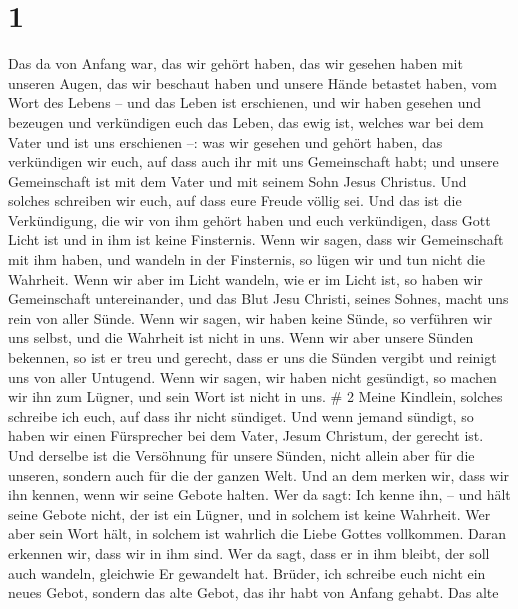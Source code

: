 \hypertarget{section}{%
\section{1}\label{section}}

 Das da von Anfang war, das wir gehört haben, das wir
gesehen haben mit unseren Augen, das wir beschaut haben und unsere Hände
betastet haben, vom Wort des Lebens --  und das Leben ist
erschienen, und wir haben gesehen und bezeugen und verkündigen euch das
Leben, das ewig ist, welches war bei dem Vater und ist uns erschienen
--:  was wir gesehen und gehört haben, das verkündigen wir
euch, auf dass auch ihr mit uns Gemeinschaft habt; und unsere
Gemeinschaft ist mit dem Vater und mit seinem Sohn Jesus Christus.
 Und solches schreiben wir euch, auf dass eure Freude völlig
sei.  Und das ist die Verkündigung, die wir von ihm gehört
haben und euch verkündigen, dass Gott Licht ist und in ihm ist keine
Finsternis.  Wenn wir sagen, dass wir Gemeinschaft mit ihm
haben, und wandeln in der Finsternis, so lügen wir und tun nicht die
Wahrheit.  Wenn wir aber im Licht wandeln, wie er im Licht
ist, so haben wir Gemeinschaft untereinander, und das Blut Jesu Christi,
seines Sohnes, macht uns rein von aller Sünde.  Wenn wir
sagen, wir haben keine Sünde, so verführen wir uns selbst, und die
Wahrheit ist nicht in uns.  Wenn wir aber unsere Sünden
bekennen, so ist er treu und gerecht, dass er uns die Sünden vergibt und
reinigt uns von aller Untugend.  Wenn wir sagen, wir haben
nicht gesündigt, so machen wir ihn zum Lügner, und sein Wort ist nicht
in uns. \# 2  Meine Kindlein, solches schreibe ich euch, auf
dass ihr nicht sündiget. Und wenn jemand sündigt, so haben wir einen
Fürsprecher bei dem Vater, Jesum Christum, der gerecht ist. 
Und derselbe ist die Versöhnung für unsere Sünden, nicht allein aber für
die unseren, sondern auch für die der ganzen Welt.  Und an
dem merken wir, dass wir ihn kennen, wenn wir seine Gebote halten.
 Wer da sagt: Ich kenne ihn, -- und hält seine Gebote nicht,
der ist ein Lügner, und in solchem ist keine Wahrheit.  Wer
aber sein Wort hält, in solchem ist wahrlich die Liebe Gottes
vollkommen. Daran erkennen wir, dass wir in ihm sind.  Wer
da sagt, dass er in ihm bleibt, der soll auch wandeln, gleichwie Er
gewandelt hat.  Brüder, ich schreibe euch nicht ein neues
Gebot, sondern das alte Gebot, das ihr habt von Anfang gehabt. Das alte
